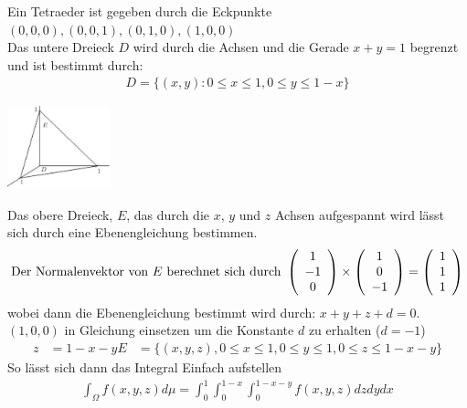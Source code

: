 \documentclass[a4paper]{article}
\begin{document}
		\begin{fmerke}
			\begin{multicols}{2}
			Ein Tetraeder ist gegeben durch die Eckpunkte $(0,0,0), (0,0,1), (0,1,0), (1,0,0)$ \\
			
			Das untere Dreieck $D$ wird durch die Achsen und die Gerade $x+y=1$ begrenzt und ist bestimmt durch:
			\begin{align*}
				D = \{(x,y): 0 \leq x \leq 1, 0 \leq y\leq 1-x \}
			\end{align*}
				\begin{center}
					\includegraphics[width=3cm]{tetraeder.png}
				\end{center}
			\end{multicols}
			Das obere Dreieck, $E$, das durch die $x$, $y$ und $z$ Achsen aufgespannt wird lässt sich durch eine Ebenengleichung bestimmen.
			\begin{align*}
				\text{Der Normalenvektor von $E$ berechnet sich durch } \left( \begin{array}{c} 1\\ -1\\0 \end{array} \right) \times \left( \begin{array}{c} 1 \\ 0 \\ -1 \end{array} \right) = \left( \begin{array}{c} 1\\ 1\\ 1 \end{array} \right)
			\end{align*}
			wobei dann die Ebenengleichung bestimmt wird durch: $x+y+z+d =0$. $(1,0,0)$ in Gleichung einsetzen um die Konstante $d$ zu erhalten ($d=-1$) 
			\begin{align*}
				z &= 1 -x -y
				E &= \{(x,y,z), 0 \leq x \leq 1, 0 \leq y \leq 1, 0 \leq z \leq 1-x-y\}
			\end{align*}
			So lässt sich dann das Integral Einfach aufstellen
			\begin{align*}
				\int_\Omega f(x,y,z) d \mu = \int_0^1 \int_0^{1-x} \int_0^{1-x-y} f(x,y,z) dzdydx
			\end{align*}
		\end{fmerke}
\end{document}
